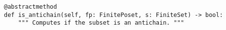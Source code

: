 \begin{verbatim}
@abstractmethod
def is_antichain(self, fp: FinitePoset, s: FiniteSet) -> bool:
    """ Computes if the subset is an antichain. """
\end{verbatim}